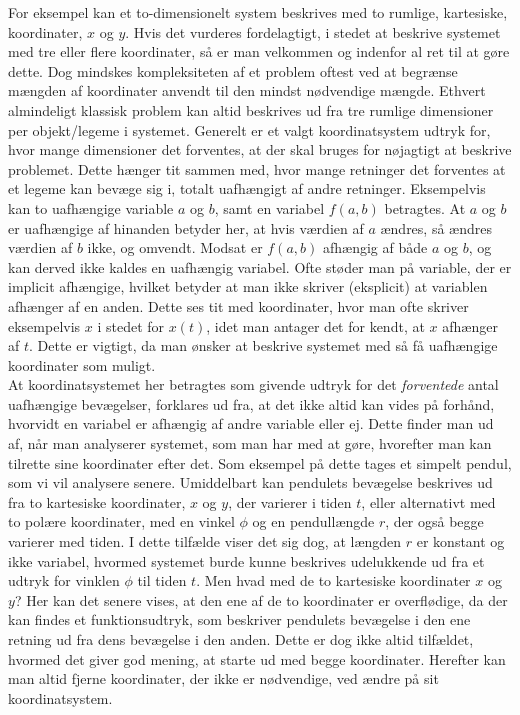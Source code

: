 For eksempel kan et to-dimensionelt system beskrives med to rumlige, kartesiske, koordinater, $x$ og $y$. Hvis det vurderes fordelagtigt, i stedet at beskrive systemet med tre eller flere koordinater, så er man velkommen og indenfor al ret til at gøre dette. Dog mindskes kompleksiteten af et problem oftest ved at begrænse mængden af koordinater anvendt til den mindst nødvendige mængde. Ethvert almindeligt klassisk problem kan altid beskrives ud fra tre rumlige dimensioner per objekt/legeme i systemet. 
Generelt er et valgt koordinatsystem udtryk for, hvor mange dimensioner det forventes, at der skal bruges for nøjagtigt at beskrive problemet. Dette hænger tit sammen med, hvor mange retninger det forventes at et legeme kan bevæge sig i, totalt uafhængigt af andre retninger. Eksempelvis kan to uafhængige variable $a$ og $b$, samt en variabel $f(a,b)$ betragtes. At $a$ og $b$ er uafhængige af hinanden betyder her, at hvis værdien af $a$ ændres, så ændres værdien af $b$ ikke, og omvendt. Modsat er $f(a,b)$ afhængig af både $a$ og $b$, og kan derved ikke kaldes en uafhængig variabel. Ofte støder man på variable, der er implicit afhængige, hvilket betyder at man ikke skriver (eksplicit) at variablen afhænger af en anden. Dette ses tit med koordinater, hvor man ofte skriver eksempelvis $x$ i stedet for $x(t)$, idet man antager det for kendt, at $x$ afhænger af $t$. Dette er vigtigt, da man ønsker at beskrive systemet med så få uafhængige koordinater som muligt. \\ %
%

At koordinatsystemet her betragtes som givende udtryk for det \textit{forventede} antal uafhængige bevægelser, forklares ud fra, at det ikke altid kan vides på forhånd, hvorvidt en variabel er afhængig af andre variable eller ej. Dette finder man ud af, når man analyserer systemet, som man har med at gøre, hvorefter man kan tilrette sine koordinater efter det. Som eksempel på dette tages et simpelt pendul, som vi vil analysere senere. Umiddelbart kan pendulets bevægelse beskrives ud fra to kartesiske koordinater, $x$ og $y$, der varierer i tiden $t$, eller alternativt med to polære koordinater, med en vinkel $\phi$ og en pendullængde $r$, der også begge varierer med tiden. I dette tilfælde viser det sig dog, at længden $r$ er konstant og ikke variabel, hvormed systemet burde kunne beskrives udelukkende ud fra et udtryk for vinklen $\phi$ til tiden $t$. Men hvad med de to kartesiske koordinater $x$ og $y$? Her kan det senere vises, at den ene af de to koordinater er overflødige, da der kan findes et funktionsudtryk, som beskriver pendulets bevægelse i den ene retning ud fra dens bevægelse i den anden. Dette er dog ikke altid tilfældet, hvormed det giver god mening, at starte ud med begge koordinater. Herefter kan man altid fjerne koordinater, der ikke er nødvendige, ved ændre på sit koordinatsystem. \\

